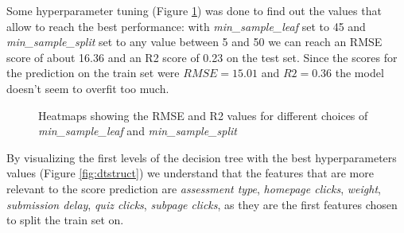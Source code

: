 \documentclass{article}
\begin{document}
Some hyperparameter tuning (Figure \ref{fig:heatmap}) was done to find out the values that allow to reach the best performance: with \textit{min\_sample\_leaf} set to 45 and \textit{min\_sample\_split} set to any value between 5 and 50 we can reach an RMSE score of about 16.36 and an R2 score of 0.23 on the test set. Since the scores for the prediction on the train set were $RMSE = 15.01$ and $R2 = 0.36$ the model doesn't seem to overfit too much. \\

\begin{figure}%
    \centering
    \qquad
    \caption{Heatmaps showing the RMSE and R2 values for different choices of \textit{min\_sample\_leaf} and \textit{min\_sample\_split}}%
    \label{fig:heatmap}%
\end{figure}

By visualizing the first levels of the decision tree with the best hyperparameters values (Figure \ref{fig:dtstruct}) we understand that the features that are more relevant to the score prediction are \textit{assessment type}, \textit{homepage clicks}, \textit{weight}, \textit{submission delay}, \textit{quiz clicks}, \textit{subpage clicks}, as they are the first features chosen to split the train set on. \\
\end{document}

